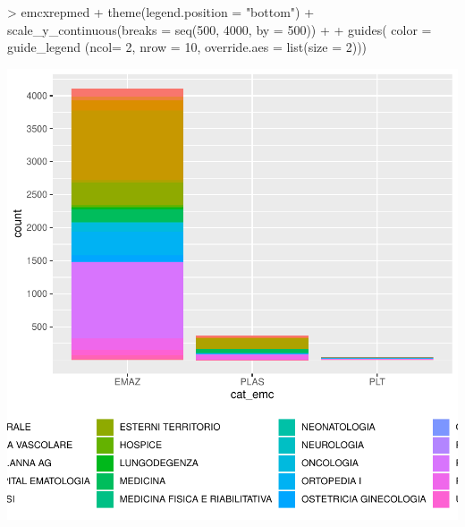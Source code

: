 \documentclass{article}
\begin{document}
\begin{Schunk}
\begin{Sinput}
> emcxrepmed + theme(legend.position = "bottom") +  scale_y_continuous(breaks = seq(500, 4000, by = 500)) +
+ guides( color = guide_legend (ncol= 2, nrow = 10, override.aes = list(size = 2)))
\end{Sinput}
\end{Schunk}
\includegraphics{tidigg-018}
\end{document}
